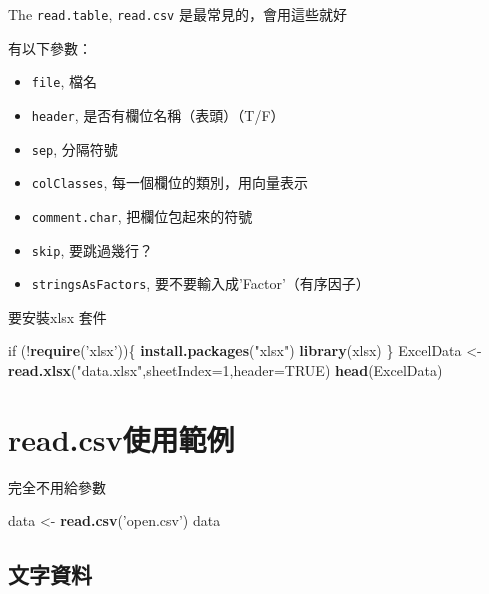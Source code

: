 \documentclass[]{book}
\newenvironment{Shaded}{\begin{snugshade}}{\end{snugshade}}
\newcommand{\KeywordTok}[1]{\textcolor[rgb]{0.13,0.29,0.53}{\textbf{{#1}}}}
\newcommand{\DataTypeTok}[1]{\textcolor[rgb]{0.13,0.29,0.53}{{#1}}}
\newcommand{\DecValTok}[1]{\textcolor[rgb]{0.00,0.00,0.81}{{#1}}}
\newcommand{\StringTok}[1]{\textcolor[rgb]{0.31,0.60,0.02}{{#1}}}
\newcommand{\OtherTok}[1]{\textcolor[rgb]{0.56,0.35,0.01}{{#1}}}
\newcommand{\NormalTok}[1]{{#1}}
\providecommand{\tightlist}{%
  \setlength{\itemsep}{0pt}\setlength{\parskip}{0pt}}
\theoremstyle{definition}
\theoremstyle{definition}
\theoremstyle{remark}
\begin{document}
The \texttt{read.table}, \texttt{read.csv} 是最常見的，會用這些就好

有以下參數：

\begin{itemize}
\tightlist
\item
  \texttt{file}, 檔名
\item
  \texttt{header}, 是否有欄位名稱（表頭）（T/F）
\item
  \texttt{sep}, 分隔符號
\item
  \texttt{colClasses}, 每一個欄位的類別，用向量表示
\item
  \texttt{comment.char}, 把欄位包起來的符號
\item
  \texttt{skip}, 要跳過幾行？
\item
  \texttt{stringsAsFactors}, 要不要輸入成'Factor'（有序因子）
\end{itemize}

要安裝xlsx 套件

\begin{Shaded}
\begin{Highlighting}[]
\NormalTok{if (!}\KeywordTok{require}\NormalTok{(}\StringTok{'xlsx'}\NormalTok{))\{}
    \KeywordTok{install.packages}\NormalTok{(}\StringTok{"xlsx"}\NormalTok{)}
    \KeywordTok{library}\NormalTok{(xlsx)}
\NormalTok{\}}
\NormalTok{ExcelData <-}\StringTok{ }\KeywordTok{read.xlsx}\NormalTok{(}\StringTok{"data.xlsx"}\NormalTok{,}\DataTypeTok{sheetIndex=}\DecValTok{1}\NormalTok{,}\DataTypeTok{header=}\OtherTok{TRUE}\NormalTok{)}
\KeywordTok{head}\NormalTok{(ExcelData)}
\end{Highlighting}
\end{Shaded}

\section{read.csv使用範例}\label{read.csv}

完全不用給參數

\begin{Shaded}
\begin{Highlighting}[]
\NormalTok{data <-}\StringTok{ }\KeywordTok{read.csv}\NormalTok{(}\StringTok{'open.csv'}\NormalTok{)}
\NormalTok{data}
\end{Highlighting}
\end{Shaded}

\subsection{文字資料}
\end{document}
